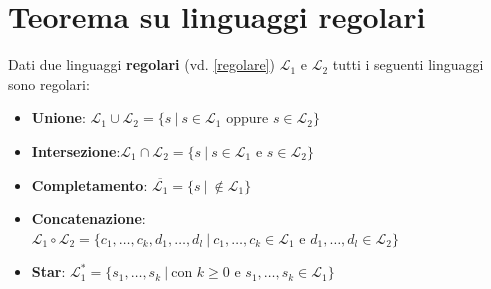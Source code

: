 \section{Teorema su linguaggi regolari}
\colorbox{SALZO}{\parbox{\dimexpr\linewidth-2\fboxsep}{\begin{theorem}
   Dati due linguaggi \textbf{regolari} (vd. \ref{regolare}) $\mathcal{L}_1$ e $\mathcal{L}_2$  tutti i seguenti linguaggi sono regolari:
   \begin{itemize}
      \item \textbf{Unione}: $\mathcal{L}_1 \cup \mathcal{L}_2 = \{ s \ |\  s \in \mathcal{L}_1 \text{ oppure }
      s \in \mathcal{L}_2 \}$
      \item \textbf{Intersezione}:$\mathcal{L}_1 \cap \mathcal{L}_2 = \{ s \ |\  s \in \mathcal{L}_1 \text{ e }
      s \in \mathcal{L}_2 \}$
      \item \textbf{Completamento}: $\overline{\mathcal{L}_1} = \{ s \ | \ \notin \mathcal{L}_1  \}$ 
   
      \item \textbf{Concatenazione}: $\mathcal{L}_1  \circ \mathcal{L_2} = \{c_1,\dots,c_k,d_1,\dots,d_l   
      \ | \  c_1,\dots,c_k \in \mathcal{L}_1 \text{ e }  d_1,\dots,d_l \in \mathcal{L}_2 \}$
      \item \textbf{Star}: $\mathcal{L}_1^* = \{   s_1,\dots,s_k \ | \ \text{con } k \ge 0 \text{ e }  s_1,\dots,s_k \in \mathcal{L}_1 \}$
   \end{itemize}
\end{theorem}}}
